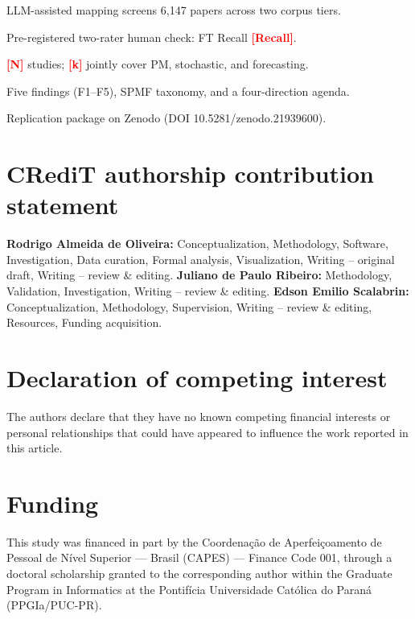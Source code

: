 \documentclass[review,3p,times]{elsarticle}
\newcommand{\tbd}[1]{\textcolor{red}{\textbf{[#1]}}}
\begin{document}
\begin{frontmatter}
\begin{highlights}
\item LLM-assisted mapping screens 6{,}147 papers across two corpus tiers.
\item Pre-registered two-rater human check: FT Recall \tbd{Recall}.
\item \tbd{N} studies; \tbd{k} jointly cover PM, stochastic, and forecasting.
\item Five findings (F1--F5), SPMF taxonomy, and a four-direction agenda.
\item Replication package on Zenodo (DOI 10.5281/zenodo.21939600).
\end{highlights}

\end{frontmatter}



\section*{CRediT authorship contribution statement}
\textbf{Rodrigo Almeida de Oliveira:} Conceptualization, Methodology,
Software, Investigation, Data curation, Formal analysis, Visualization,
Writing -- original draft, Writing -- review \& editing.
\textbf{Juliano de Paulo Ribeiro:} Methodology, Validation, Investigation,
Writing -- review \& editing.
\textbf{Edson Emilio Scalabrin:} Conceptualization, Methodology,
Supervision, Writing -- review \& editing, Resources, Funding acquisition.

\section*{Declaration of competing interest}
The authors declare that they have no known competing financial interests
or personal relationships that could have appeared to influence the work
reported in this article.

\section*{Funding}
This study was financed in part by the Coordena\c c\~ao de Aperfei\c
coamento de Pessoal de N\'ivel Superior --- Brasil (CAPES) --- Finance
Code 001, through a doctoral scholarship granted to the corresponding
author within the Graduate Program in Informatics at the Pontif\'icia
Universidade Cat\'olica do Paran\'a (PPGIa/PUC-PR).
\end{document}

